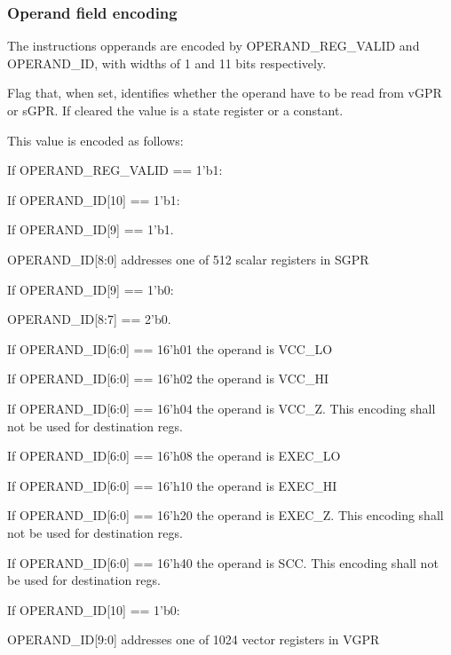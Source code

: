 \documentclass{article}
\begin{document}
\subsubsection{Operand field encoding}
The instructions opperands are encoded by OPERAND\_REG\_VALID and OPERAND\_ID, with widths of 1 and 11 bits respectively.

\begin{description}
\item[OPERAND\_REG\_VALID:] Flag that, when set, identifies whether the operand have to be read from vGPR or sGPR. If cleared the value is a state register or a constant.

\item[OPERAND\_ID:] This value is encoded as follows:
  \begin{description}
  \item If OPERAND\_REG\_VALID == 1'b1:
    \begin{description}
    \item If OPERAND\_ID[10] == 1'b1:
      \begin{description}
      \item If OPERAND\_ID[9] == 1'b1.
        \begin{description}
        \item OPERAND\_ID[8:0] addresses one of 512 scalar registers in SGPR
        \end{description}
      \item If OPERAND\_ID[9] == 1'b0:
        \begin{description}
        \item OPERAND\_ID[8:7] == 2'b0.
        \item If OPERAND\_ID[6:0] == 16'h01 the operand is VCC\_LO
        \item If OPERAND\_ID[6:0] == 16'h02 the operand is VCC\_HI
        \item If OPERAND\_ID[6:0] == 16'h04 the operand is VCC\_Z. This encoding shall not be used for destination regs.
        \item If OPERAND\_ID[6:0] == 16'h08 the operand is EXEC\_LO
        \item If OPERAND\_ID[6:0] == 16'h10 the operand is EXEC\_HI
        \item If OPERAND\_ID[6:0] == 16'h20 the operand is EXEC\_Z. This encoding shall not be used for destination regs.
        \item If OPERAND\_ID[6:0] == 16'h40 the operand is SCC. This encoding shall not be used for destination regs.
        \end{description}
      \end{description}
    \item If OPERAND\_ID[10] == 1'b0:
      \begin{description}
      \item OPERAND\_ID[9:0] addresses one of 1024 vector registers in VGPR
      \end{description}
    \end{description}
  

\end{description}
\end{description}
\end{document}
